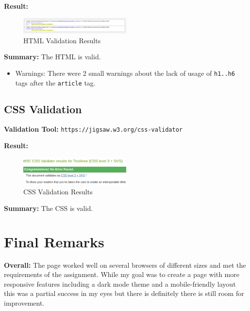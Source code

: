 \documentclass{article}
\begin{document}
\textbf{Result:}
\begin{figure}[h]
    \centering
    \includegraphics[width=0.5\textwidth]{graphics/HTML_validation.png}
    \caption{HTML Validation Results}
\end{figure}

\textbf{Summary:} The HTML is valid.
\begin{itemize}
    \item Warnings: There were 2 small warnings about the lack of usage of \texttt{h1..h6} tags after the \texttt{article} tag.
\end{itemize}

\subsection{CSS Validation}
\textbf{Validation Tool:} \texttt{https://jigsaw.w3.org/css-validator}

\textbf{Result:}
\begin{figure}[h]
    \centering
    \includegraphics[width=0.5\textwidth]{graphics/CSS_validation.png}
    \caption{CSS Validation Results}
\end{figure}

\textbf{Summary:} The CSS is valid.

\section{Final Remarks}
\label{sec:final-remarks} 

\textbf{Overall:} The page worked well on several browsers of different sizes and met the requirements of the assignment. 
While my goal was to create a page with more responsive features including a dark mode theme and a mobile-friendly layout 
this was a partial success in my eyes but there is definitely there is still room for improvement.
\end{document}
